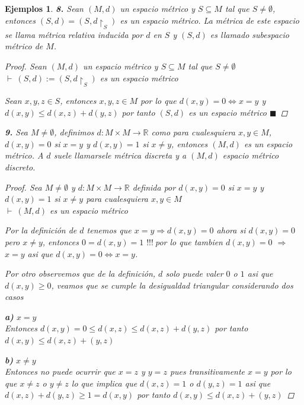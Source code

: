 \documentclass[oneside]{book} %
\theoremstyle{Teorema}
\theoremstyle{Ejemplos}
\newtheorem{Ejemplos}[Definicion]{Ejemplos}
\theoremstyle{[Obs]}
\renewcommand{\{}{\left\lbrace} %
\renewcommand{\}}{\right\rbrace} %
\renewcommand{\sc}{\subseteq} %
\newcommand{\R}{\mathbb{R}} %
\renewcommand{\qed}{$\blacksquare$} %
\newcommand{\pd}{$\vdash\ $} %
\renewcommand{\c}{$!!!\ $} %
\newcommand{\Imp}{$\Rightarrow\ $} %
\begin{document}
\begin{Ejemplos}
				\textbf{8.} Sean $(M, d)$ un espacio métrico y $S \sc M$ tal que $S \neq \emptyset$, entonces $(S, d) = (S, d\restriction_{S})$ es un espacio métrico. La métrica de este espacio se llama métrica relativa inducida por $d$ en $S$ y $(S, d)$ es llamado subespacio métrico de $M$. 

				\begin{proof}
					
					Sean $(M, d)$ un espacio métrico y $S \sc M$ tal que $S \neq \emptyset$ \\
					\pd $(S, d) := (S, d\restriction_{S})$ es un espacio métrico

					Sean $x, y, z \in S$, entonces $x, y, z \in M$ por lo que $d(x, y) = 0 \Leftrightarrow x = y$ y $d(x, y) \leq d(x, z) + d(y, z)$ por tanto $(S, d)$ es un espacio métrico \qed

				\end{proof}

				\textbf{9.} Sea $M \neq \emptyset$, definimos $d : M \times M \to \R$ como para cualesquiera $x, y \in M$, $d(x, y) = 0$ si $x = y$ y $d(x, y) = 1$ si $x \neq y$, entonces $(M, d)$ es un espacio métrico. A $d$ suele llamarsele métrica discreta y a $(M, d)$ espacio métrico discreto.

				\begin{proof}
					
					Sea $M \neq \emptyset$ y $d : M \times M \to \R$ definida por $d(x, y) = 0$ si $x = y$ y $d(x, y) = 1$ si $x \neq y$ para cualesquiera $x, y \in M$ \\
					\pd $(M, d)$ es un espacio métrico

					Por la definición de $d$ tenemos que $x = y \Rightarrow d(x, y) = 0$ ahora si $d(x, y) = 0$ pero $x \neq y$, entonces $0 = d(x, y) = 1$ \c por lo que tambien $d(x, y) = 0$ \Imp $x = y$ asi que $d(x, y) = 0 \Leftrightarrow x = y$.

					Por otro observemos que de la definición, $d$ solo puede valer $0$ o $1$ asi que $d(x, y) \geq 0$, veamos que se cumple la desigualdad triangular considerando dos casos 

					\textbf{a)} $x = y$ \\
					Entonces $d(x, y) = 0 \leq d(x, z) \leq d(x, z) + d(y, z)$ por tanto $d(x, y) \leq d(x, z) + (y, z)$

					\textbf{b)} $x \neq y$ \\
					Entonces no puede ocurrir que $x = z$ y $y = z$ pues transitivamente $x = y$ por lo que $x \neq z$ o $y \neq z$ lo que implica que $d(x, z) = 1$ o $d(y, z) = 1$ asi que $d(x, z) + d(y, z) \geq 1 = d(x, y)$ por tanto $d(x, y) \leq d(x, z) + (y, z)$


\end{proof}
\end{Ejemplos}
\end{document}
